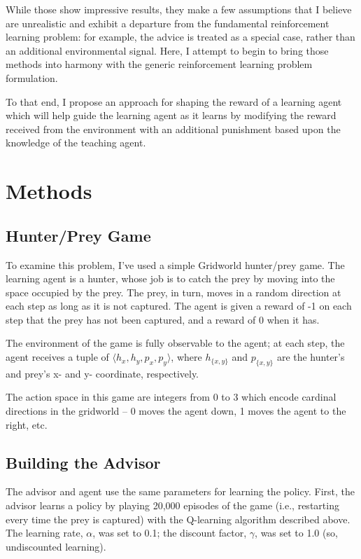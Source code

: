 \documentclass[twocolumn]{article}
\begin{document}
While those show impressive results, they make a few assumptions that I
believe are unrealistic and exhibit a departure from the fundamental
reinforcement learning problem: for example, the advice is treated as a
special case, rather than an additional environmental signal. Here, I
attempt to begin to bring those methods into harmony with the generic
reinforcement learning problem formulation.

To that end, I propose an approach for shaping the reward of a learning
agent which will help guide the learning agent as it learns by modifying
the reward received from the environment with an additional punishment
based upon the knowledge of the teaching agent.

\hypertarget{methods}{\section{Methods}\label{methods}}

\hypertarget{hunterprey-game}{\subsection{Hunter/Prey Game}\label{hunterprey-game}}

To examine this problem, I've used a simple Gridworld hunter/prey game.
The learning agent is a hunter, whose job is to catch the prey by moving
into the space occupied by the prey. The prey, in turn, moves in a
random direction at each step as long as it is not captured. The agent
is given a reward of -1 on each step that the prey has not been
captured, and a reward of 0 when it has.

The environment of the game is fully observable to the agent; at each
step, the agent receives a tuple of
\(\langle h_x, h_y, p_x, p_y \rangle\), where \(h_{\{x,y\}}\) and
\(p_{\{x,y\}}\) are the hunter's and prey's x- and y- coordinate,
respectively.

The action space in this game are integers from 0 to 3 which encode
cardinal directions in the gridworld -- 0 moves the agent down, 1 moves
the agent to the right, etc.

\hypertarget{building-the-advisor}{\subsection{Building the Advisor}\label{building-the-advisor}}

The advisor and agent use the same parameters for learning the policy.
First, the advisor learns a policy by playing 20,000 episodes of the
game (i.e., restarting every time the prey is captured) with the
Q-learning algorithm described above. The learning rate, \(\alpha\), was
set to 0.1; the discount factor, \(\gamma\), was set to 1.0 (so,
undiscounted learning).
\end{document}
